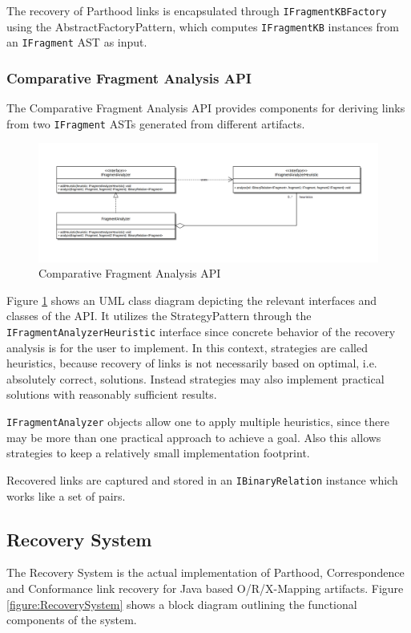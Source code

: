 The recovery of \gls{Parthood} links is encapsulated through \texttt{IFragmentKB\-Factory} using the \gls{AbstractFactoryPattern}, which computes \texttt{IFragmentKB} instances from an \texttt{IFragment} \gls{AST} as input.


\subsubsection{Comparative Fragment Analysis API}
\label{subsubsection:ComparativeFragmentAnalysisAPI}
The Comparative Fragment Analysis \gls{API} provides components for deriving links from two \texttt{IFragment} \glspl{AST} generated from different artifacts.
\begin{figure}[h!]
\begin{center}
\includegraphics[width=\textwidth]{images/ComparativeFragmentAnalysisAPI.png}
\end{center}
\caption{Comparative Fragment Analysis API}
\label{figure:ComparativeFragmentAnalysisAPI}
\end{figure}
Figure \ref{figure:ComparativeFragmentAnalysisAPI} shows an \gls{UML} class diagram depicting the relevant interfaces and classes of the \gls{API}.
It utilizes the \gls{StrategyPattern} through the \texttt{IFragmentAnalyzerHeuristic} interface since concrete behavior of the recovery analysis is for the user to implement.
In this context, strategies are called heuristics, because recovery of links is not necessarily based on optimal, i.e. absolutely correct, solutions.
Instead strategies may also implement practical solutions with reasonably sufficient results.

\texttt{IFragmentAnalyzer} objects allow one to apply multiple heuristics, since there may be more than one practical approach to achieve a goal. Also this allows strategies to keep a relatively small implementation footprint.

Recovered links are captured and stored in an \texttt{IBinaryRelation} instance which works like a set of pairs.

\subsection{Recovery System}
\label{subsection:RecoverySystem}
The Recovery System is the actual implementation of \gls{Parthood}, \gls{Correspondence} and \gls{Conformance} link recovery for Java based \gls{O/R/X-Mapping} artifacts.
Figure \ref{figure:RecoverySystem} shows a block diagram outlining the functional components of the system.

